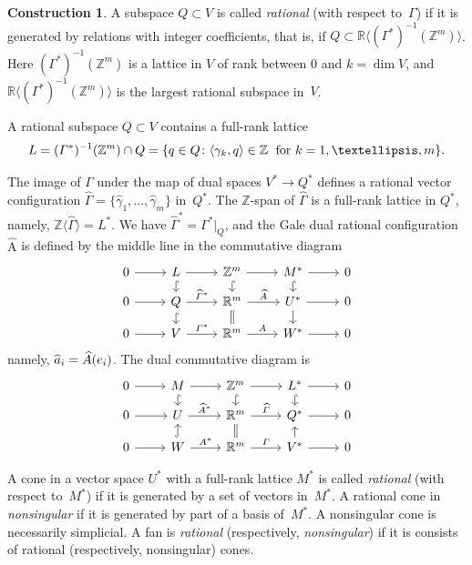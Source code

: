 \documentclass[a4paper]{amsart}
\theoremstyle{definition}
\newtheorem{construction}[theorem]{Construction}
\theoremstyle{remark}
\numberwithin{equation}{section}
\def\R{\mathbb R}
\def\R{\mathbb R}
\def\Z{\mathbb Z}
\newcommand{\mb}[1]{{\textbf {\textit#1}}}
\newcommand{\<}{\langle}
\renewcommand{\>}{\rangle}
\begin{document}
\begin{construction}\label{coras}
A subspace $Q\subset V$ is called \emph{rational} (with respect to~$\Gamma$) if it is generated by relations with integer coefficients, that is, if $Q\subset\R\langle(\varGamma^{*})^{-1}(\Z^m)\rangle$. Here
$(\varGamma^{*})^{-1}(\Z^m)$ is a lattice in $V$ of rank between $0$ and $k=\dim V$, and $\R\langle(\varGamma^{*})^{-1}(\Z^m)\rangle$ is the largest rational subspace in~$V$.

A rational subspace $Q\subset V$ contains a full-rank lattice
\begin{equation}\label{Llatt}
  L=(\varGamma^{*})^{-1}(\Z^m)\cap Q=
  \{\mb q\in Q\colon\langle\gamma_k,\mb q\rangle\in\Z\;
  \text{ for }k=1,\ldots,m\}.
\end{equation}

The image of $\Gamma$ under the map of dual spaces $V^*\to Q^*$ defines a rational vector configuration $\widehat\Gamma=\{\widehat\gamma_1,\ldots,\widehat\gamma_m\}$ in~$Q^*$. The $\Z$-span of $\widehat\Gamma$ is a full-rank lattice in $Q^*$, namely, $\Z\langle\widehat\Gamma\rangle=L^*$. 
We have $\widehat{\varGamma}^*=\varGamma^*|_Q$, and the Gale dual rational configuration $\widehat{\mathrm A}$ is defined by the middle line in the commutative diagram
\[
\begin{tikzcd}[row sep=small]
  0 \ar{r} & L \ar{r} \ar[hook]{d} & \Z^m  \ar{r}\ar[hook]{d}  & 
  M^* \ar{r} \ar[hook]{d} & 0\\
  0 \ar{r} & Q \ar{r}{\widehat{\varGamma}^*} \ar[hook]{d} & 
  \R^m \ar{r}{\widehat A} \ar[equal]{d} & U^* \ar{r} \ar{d} & 0\\
  0 \ar{r} & V \ar{r}{\varGamma^*} & \R^m \ar{r}{A} & W^* \ar{r} & 0
\end{tikzcd}
\]
namely, $\widehat{\mb a}_i=\widehat A(\mb e_i)$. The dual commutative diagram is
\[
\begin{tikzcd}[row sep=small]
  0 \ar{r} & M \ar{r} \ar[hook]{d} & \Z^m  \ar{r}\ar[hook]{d}  & 
  L^* \ar{r} \ar[hook]{d} & 0\\
  0 \ar{r} & U \ar{r}{\widehat{A}^*}  & 
  \R^m \ar{r}{\widehat\varGamma} & Q^* \ar{r} & 0\\
  0 \ar{r} & W \ar{r}{A^*} \ar[hook]{u} & \R^m \ar{r}{\varGamma}\ar[equal]{u} 
  & V^* \ar{r}\ar{u} & 0
\end{tikzcd}
\]
\end{construction}

A cone in a vector space $U^*$ with a full-rank lattice $M^*$ is called \emph{rational} (with respect to~$M^*$) if it is generated by a set of vectors in~$M^*$. A rational cone in \emph{nonsingular} if it is generated by part of a basis of~$M^*$. A nonsingular cone is necessarily simplicial. A fan is \emph{rational} (respectively, \emph{nonsingular}) if it is consists of rational (respectively, nonsingular) cones. 
\end{document}
